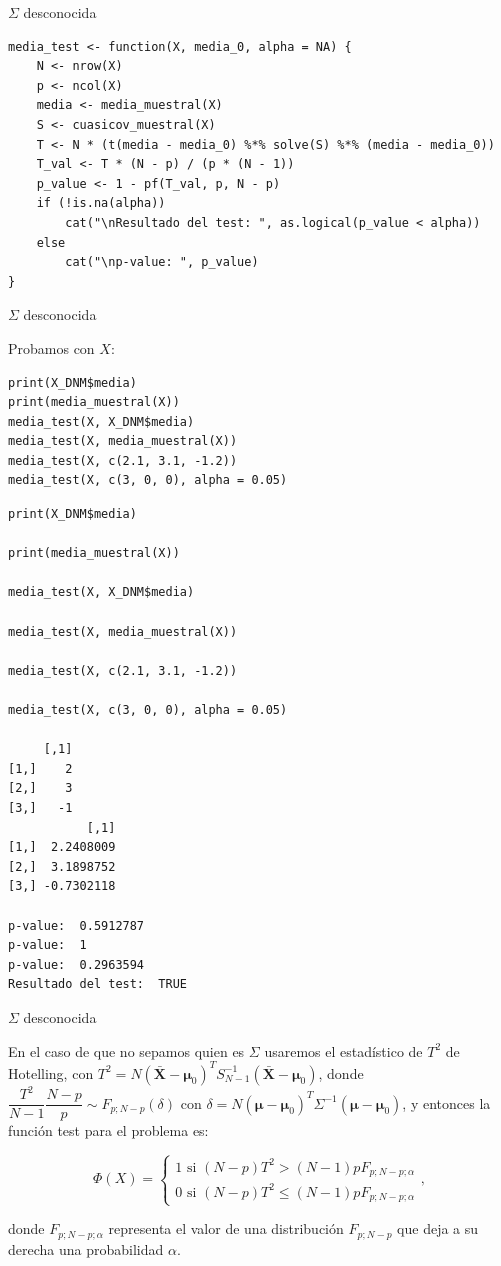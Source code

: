 \documentclass[xcolor=table]{beamer}
\begin{document}
\begin{frame}[fragile]{$\Sigma$ desconocida}

\begin{lstlisting}
media_test <- function(X, media_0, alpha = NA) {
    N <- nrow(X)
    p <- ncol(X)
    media <- media_muestral(X)
    S <- cuasicov_muestral(X)
    T <- N * (t(media - media_0) %*% solve(S) %*% (media - media_0))
    T_val <- T * (N - p) / (p * (N - 1))
    p_value <- 1 - pf(T_val, p, N - p)
    if (!is.na(alpha))
        cat("\nResultado del test: ", as.logical(p_value < alpha))
    else
        cat("\np-value: ", p_value)
}

\end{lstlisting}

\end{frame}

\begin{frame}[fragile]{$\Sigma$ desconocida}

Probamos con $X$:

\begin{lstlisting}
print(X_DNM$media)
print(media_muestral(X))
media_test(X, X_DNM$media)
media_test(X, media_muestral(X))
media_test(X, c(2.1, 3.1, -1.2))
media_test(X, c(3, 0, 0), alpha = 0.05)
\end{lstlisting}

\begin{lstlisting}
print(X_DNM$media)

print(media_muestral(X))

media_test(X, X_DNM$media)

media_test(X, media_muestral(X))

media_test(X, c(2.1, 3.1, -1.2))

media_test(X, c(3, 0, 0), alpha = 0.05)

     [,1]
[1,]    2
[2,]    3
[3,]   -1
           [,1]
[1,]  2.2408009
[2,]  3.1898752
[3,] -0.7302118

p-value:  0.5912787
p-value:  1
p-value:  0.2963594
Resultado del test:  TRUE
\end{lstlisting}

\end{frame}


\begin{frame}[fragile]{$\Sigma$ desconocida}

En el caso de que no sepamos quien es $\Sigma$ usaremos el estadístico de $T^2$ de Hotelling, con $T^2 = N (\pmb{\bar{X}} - \pmb{\mu}_0)^T S_{N-1}^{-1} (\pmb{\bar{X}} - \pmb{\mu}_0)$, donde $\dfrac{T^2}{N-1} \dfrac{N-p}{p} \sim F_{p;N-p}(\delta)$ con $\delta = N (\pmb{\mu} - \pmb{\mu}_0)^T \Sigma^{-1} (\pmb{\mu} - \pmb{\mu}_0)$, y entonces la función test para el problema es:

$$ \Phi(X) = \begin{cases} 1 \text{ si } (N-p)T^2 > (N-1)pF_{p;N-p;\alpha} \\ 0 \text{ si } (N-p)T^2 \leq (N-1)pF_{p;N-p;\alpha} \end{cases}, $$

donde $F_{p;N-p;\alpha}$ representa el valor de una distribución $F_{p;N-p}$ que deja a su derecha una probabilidad $\alpha$.

\end{frame}
\end{document}
